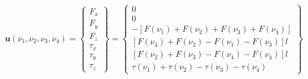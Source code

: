 \begin{equation}\label{eq:SistemaQuadrirotore_vettorecomando}
	\mathbf{u}(\nu_1,\nu_2,\nu_3,\nu_4) = 
	\begin{Bmatrix}
		F_x \\ F_y \\ F_z \\ \tau_x \\ \tau_y \\ \tau_z
	\end{Bmatrix}
	=\begin{Bmatrix}
		0 \\ 0 \\
		-\left[F(\nu_1)+F(\nu_2)+F(\nu_3)+F(\nu_4)\right] \\
		\left[F(\nu_4)+F(\nu_2)-F(\nu_1)-F(\nu_3)\right ] l \\
		\left[F(\nu_2)+F(\nu_3)-F(\nu_4)-F(\nu_4)\right] l \\
		\tau(\nu_1)+\tau(\nu_2)-\tau(\nu_3)-\tau(\nu_4)
	\end{Bmatrix}
\end{equation} 

